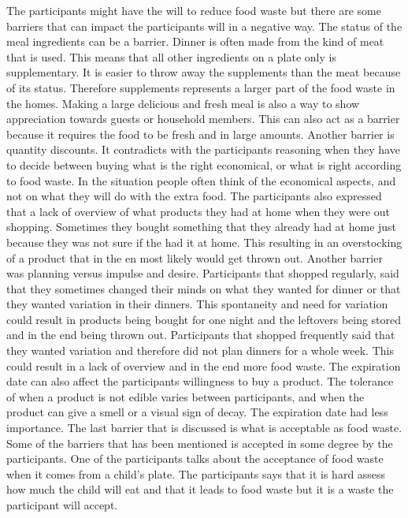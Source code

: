 The participants might have the will to reduce food waste but there are some barriers that can impact the participants will in a negative way. The status of the meal ingredients can be a barrier. Dinner is often made from the kind of meat that is used. This means that all other ingredients on a plate only is supplementary. It is easier to throw away the supplements than the meat because of its status. Therefore supplements represents a larger part of the food waste in the homes. Making a large delicious and fresh meal is also a way to show appreciation towards guests or household members. This can also act as a barrier because it requires the food to be fresh and in large amounts. Another barrier is quantity discounts. It contradicts with the participants reasoning when they have to decide between buying what is the right economical, or what is right according to food waste. In the situation people often think of the economical aspects, and not on what they will do with the extra food. The participants also expressed that a lack of overview of what products they had at home when they were out shopping. Sometimes they bought something that they already had at home just because they was not sure if the had it at home. This resulting in an overstocking of a product that in the en most likely would get thrown out. Another barrier was planning versus impulse and desire. Participants that shopped regularly, said that they sometimes changed their minds on what they wanted for dinner or that they wanted variation in their dinners. This spontaneity and need for variation could result in products being bought for one night and the leftovers being stored and in the end being thrown out. Participants that shopped frequently said that they wanted variation and therefore did not plan dinners for a whole week. This could result in a lack of overview and in the end more food waste. The expiration date can also affect the participants willingness to buy a product. The tolerance of when a product is not edible varies between participants, and when the product can give a smell or a visual sign of decay. The expiration date had less importance. The last barrier that is discussed is what is acceptable as food waste. Some of the barriers that has been mentioned is accepted in some degree by the participants. One of the participants talks about the acceptance of food waste when it comes from a child's plate. The participants says that it is hard assess how much the child will eat and that it leads to food waste but it is a waste the participant will accept.